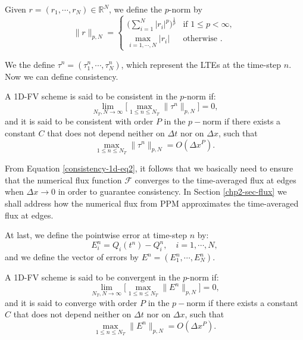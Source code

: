 Given $r = (r_1, \cdots, r_N) \in \mathbb{R}^N$, we define the $p$-norm by
\begin{equation*}
	\label{chp2-pnorm}
	\|r\|_{p,N}=
	\begin{cases}
		\bigg( \sum_{i=1}^{N} |r_i|^p \bigg)^{\frac{1}{p}} & \text{if } 1\leq p < \infty,\\
		\max_{i=1, \cdots, N}{|r_i|} & \text{otherwise }.
	\end{cases}
\end{equation*}

We the define $\tau^n = (\tau_1^n, \cdots, \tau^n_N)$, which represent the LTEs at the time-step $n$.
Now we can define consistency.
\begin{definition}
	A 1D-FV scheme is said to be consistent in the $p$-norm if:
	\begin{equation*}
		\lim_{N_T, N \to \infty}\bigg[ {\max_{1\leq n\leq N_T}}{\|\tau^n\|_{p,N}} \bigg] = 0,
	\end{equation*}
	and it is said to be consistent with order $P$ in the $p-$norm if there exists a constant 
	$C$ that does not depend neither on $\Delta t$ nor on $\Delta x$, such that
	\begin{equation*}
		{\max_{1\leq n\leq N_T}}{\|\tau^n\|_{p,N}} = O(\Delta x^P).
	\end{equation*}
\end{definition}

From Equation \eqref{consistency-1d-eq2}, it follows that we basically need to ensure that 
the numerical flux function $\mathcal{F}$ converges to the time-averaged flux at edges
when $\Delta x \to 0$ in order to guarantee consistency.
In Section \ref{chp2-sec-flux} we shall address how the numerical flux from PPM
approximates the time-averaged flux at edges.

At last, we define the pointwise error at time-step $n$ by:
\begin{equation*}
	E_i^n = Q_i(t^n) - Q_i^n, \quad i=1, \cdots, N,
\end{equation*}
and we define the vector of errors by $E^n = (E_1^n, \cdots, E_N^n)$. 
\begin{definition}
	A 1D-FV scheme is said to be convergent in the $p$-norm if:
	\begin{equation*}
		\lim_{N_T, N \to \infty}\bigg[ {\max_{1\leq n\leq N_T}}{\|E^n\|_{p,N}} \bigg] = 0,
	\end{equation*}
	and it is said to converge with order $P$ in the $p-$norm if there exists a constant 
	$C$ that does not depend neither on $\Delta t$ nor on $\Delta x$, such that
	\begin{equation*}
		{\max_{1\leq n\leq N_T}}{\|E^n\|_{p,N}} = O(\Delta x^P).
	\end{equation*}
\end{definition}

